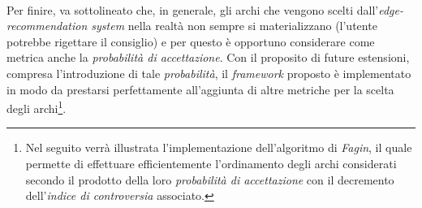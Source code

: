 \documentclass[trieste,12pt]{toptesi}
\makeatletter
\newcommand\listofcodes{%
 \iffrontmatter\else\frontmattertrue\fi
 \if@openright\cleardoublepage\else\clearpage\fi
 \begingroup\def\chapter##1{\@schapter}
 \phantomsection %
 \lstlistoflistings 
 \endgroup
}
\makeatother
\begin{document}
\\Per finire, va sottolineato che, in generale, gli archi che vengono scelti dall'\textit{edge-recommendation system} nella realtà non sempre si materializzano (l'utente potrebbe rigettare il consiglio) e per questo è opportuno considerare come metrica anche la \textit{probabilità di accettazione}. Con il proposito di future estensioni, compresa l'introduzione di tale \textit{probabilità}, il \textit{framework} proposto è implementato in modo da prestarsi perfettamente all'aggiunta di altre metriche per la scelta degli archi\footnote{Nel seguito verrà illustrata l'implementazione dell'algoritmo di \textit{Fagin}, il quale permette di effettuare efficientemente l'ordinamento degli archi considerati secondo il prodotto della loro \textit{probabilità di accettazione} con il decremento dell'\textit{indice di controversia} associato.}.





\tableofcontents

\listoffigures

\listoftables

\listofcodes


\mainmatter





\appendix



\nocite{*}
\printbibliography
\end{document}

